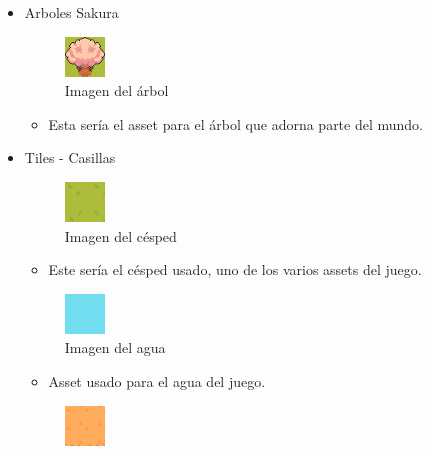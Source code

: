 \documentclass[a4paper]{article}
\begin{document}
\begin{appendices}
\begin{itemize}
\begin{itemize}
        \end{itemize}
        \item Arboles Sakura
        \begin{figure}[ht]
            \centering
            \includegraphics[width=0.1\textwidth]{Images/arboles.png}
            \caption{Imagen del árbol}
            \label{fig:arbol}
        \end{figure}
        \begin{itemize}
            \item Esta sería el asset para el árbol que adorna parte del mundo.
        \end{itemize}
        \clearpage
        \item Tiles - Casillas
        \begin{figure}[ht]
            \centering
            \includegraphics[width=0.1\textwidth]{Images/cesped1.png}
            \caption{Imagen del césped}
            \label{fig:cesped}
        \end{figure}
        \begin{itemize}
            \item Este sería el césped usado, uno de los varios assets del juego.
        \end{itemize}
        \begin{figure}[ht]
            \centering
            \includegraphics[width=0.1\textwidth]{Images/agua.png}
            \caption{Imagen del agua}
            \label{fig:agua}
        \end{figure}
        \begin{itemize}
            \item Asset usado para el agua del juego.
        \end{itemize}
        \begin{figure}[ht]
            \centering
            \includegraphics[width=0.1\textwidth]{Images/arena.png}

\end{figure}
\end{itemize}
\end{appendices}
\end{document}
